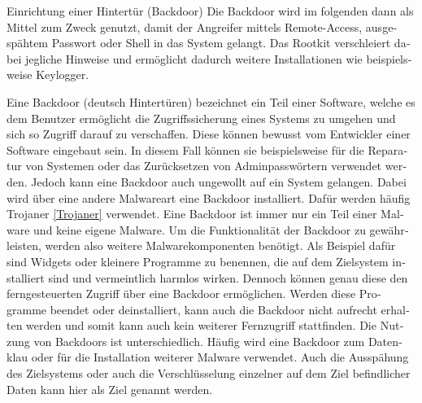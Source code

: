 \begin{otherlanguage}{ngerman}
    Einrichtung einer Hintertür (Backdoor)
    \newline Die Backdoor wird im folgenden dann als Mittel zum Zweck genutzt, damit der Angreifer mittels Remote-Access, ausgespähtem Passwort oder Shell in das System gelangt. Das Rootkit verschleiert dabei jegliche Hinweise und ermöglicht dadurch weitere Installationen wie beispielsweise Keylogger.
    
    Eine Backdoor (deutsch \dq Hintertüren\dq) bezeichnet ein Teil einer Software, welche es dem Benutzer ermöglicht die Zugriffssicherung eines Systems zu umgehen und sich so Zugriff darauf zu verschaffen. Diese können bewusst vom Entwickler einer Software eingebaut sein. In diesem Fall können sie beispielsweise für die Reparatur von Systemen oder das Zurücksetzen von Adminpasswörtern verwendet werden. Jedoch kann eine Backdoor auch ungewollt auf ein System gelangen. Dabei wird über eine andere Malwareart eine Backdoor installiert. Dafür werden häufig Trojaner \ref{Trojaner} verwendet. Eine Backdoor ist immer nur ein Teil einer Malware und keine eigene Malware. Um die Funktionalität der Backdoor zu gewährleisten, werden also weitere Malwarekomponenten benötigt. Als Beispiel dafür sind Widgets oder kleinere Programme zu benennen, die auf dem Zielsystem installiert sind und vermeintlich harmlos wirken. Dennoch können genau diese den ferngesteuerten Zugriff über eine Backdoor ermöglichen. Werden diese Programme beendet oder deinstalliert, kann auch die Backdoor nicht aufrecht erhalten werden und somit kann auch kein weiterer Fernzugriff stattfinden.
    Die Nutzung von Backdoors ist unterschiedlich. Häufig wird eine Backdoor zum Datenklau oder für die Installation weiterer Malware verwendet. Auch die Ausspähung des Zielsystems oder auch die Verschlüsselung einzelner auf dem Ziel befindlicher Daten kann hier als Ziel genannt werden.
  
\end{otherlanguage}